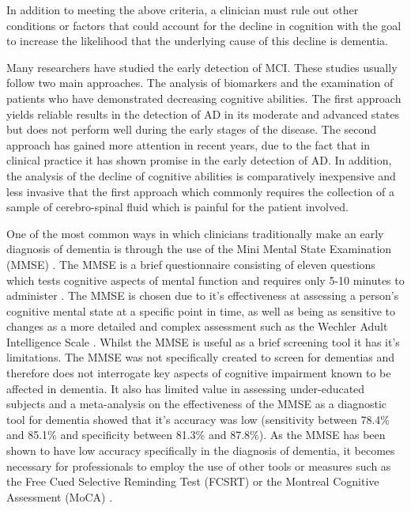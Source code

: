 \documentclass[10pt, letterpaper, twoside, openany]{book}
\begin{document}
In addition to meeting the above criteria, a clinician must rule out other conditions or factors that could account for the decline in cognition with the goal to increase the likelihood that the underlying cause of this decline is dementia. 
\par 
Many researchers have studied the early detection of MCI. These studies usually follow two main approaches. The analysis of biomarkers and the examination of patients who have demonstrated decreasing cognitive abilities. The first approach yields reliable results in the detection of AD in its moderate and advanced states but does not perform well during the early stages of the disease. The second approach has gained more attention in recent years, due to the fact that in clinical practice it has shown promise in the early detection of AD. In addition, the analysis of the decline of cognitive abilities is comparatively inexpensive and less invasive that the first approach which commonly requires the collection of a sample of cerebro-spinal fluid which is painful for the patient involved. 
\par
One of the most common ways in which clinicians traditionally make an early diagnosis of dementia is through the use of the Mini Mental State Examination (MMSE) \cite{Folstein1975}. The MMSE is a brief questionnaire consisting of eleven questions which tests cognitive aspects of mental function and requires only 5-10 minutes to administer \cite{Folstein1975}. The MMSE is chosen due to it's effectiveness at assessing a person's cognitive mental state at a specific point in time, as well as being as sensitive to changes as a more detailed and complex assessment such as the Wechler Adult Intelligence Scale \cite{Folstein1975}. Whilst the MMSE is useful as a brief screening tool it has it's limitations. The MMSE was not specifically created to screen for dementias and therefore does not interrogate key aspects of cognitive impairment known to be affected in dementia. It also has limited value in assessing under-educated subjects and a meta-analysis on the effectiveness of the MMSE as a diagnostic tool for dementia showed that it's accuracy was low (sensitivity between 78.4\% and 85.1\% and specificity between 81.3\% and 87.8\%). As the MMSE has been shown to have low accuracy specifically in the diagnosis of dementia, it becomes necessary for professionals to employ the use of other tools or measures such as the Free Cued Selective Reminding Test (FCSRT) \cite{Grober2010} or the Montreal Cognitive Assessment (MoCA) \cite{Davis2015}. 
\par 
\end{document}
